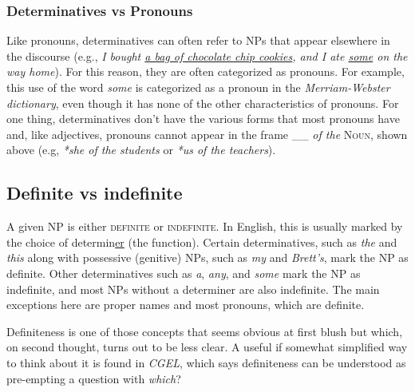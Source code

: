\subsubsection*{Determinatives vs Pronouns}

Like pronouns, determinatives can often refer to NPs that appear elsewhere in the discourse (e.g., \textit{I bought \uline{a bag of chocolate chip cookies}, and I ate \uline{some} on the way home}). For this reason, they are often categorized as pronouns. For example, this use of the word \textit{some} is categorized as a pronoun in the \textit{Merriam-Webster dictionary}, even though it has none of the other characteristics of pronouns. For one thing, determinatives don't have the various forms that most pronouns have and, like adjectives, pronouns cannot appear in the frame \_\_ \textit{of the} \textsc{Noun}, shown above (e.g, \textit{*she of the students} or \textit{*us of the teachers}).

\subsection{Definite vs indefinite} \label{sec:definite-v-indef}

A given NP is either \textsc{definite} or \textsc{indefinite}. In English, this is usually marked by the choice of determin\uline{er} (the function). Certain determinatives, such as \textit{the} and \textit{this} along with possessive (genitive) NPs, such as \textit{my} and \textit{Brett's}, mark the NP as definite. Other determinatives such as \textit{a}, \textit{any}, and \textit{some} mark the NP as indefinite, and most NPs without a determiner are also indefinite. The main exceptions here are proper names and most pronouns, which are definite.

Definiteness is one of those concepts that seems obvious at first blush but which, on second thought, turns out to be less clear. A useful if somewhat simplified way to think about it is found in \textit{CGEL}, which says definiteness can be understood as pre-empting a question with \textit{which}? 

